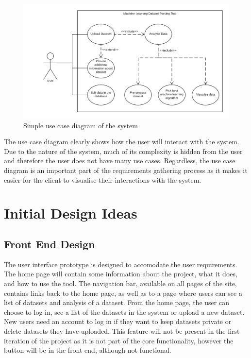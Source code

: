 \documentclass[titlepage]{article}
\begin{document}
\begin{figure}[h!]
  \centering
  \includegraphics[width=\textwidth]{usecase}
  \caption{Simple use case diagram of the system}
  \label{usecase}
\end{figure}

The use case diagram clearly shows how the user will interact with the system. Due to the nature of the system, much of its complexity is hidden from the user and therefore the user does not have many use cases. Regardless, the use case diagram is an important part of the requirements gathering process as it makes it easier for the client to visualise their interactions with the system.

\section{Initial Design Ideas}
\subsection{Front End Design}
The user interface prototype is designed to accomodate the user requirements. The home page will contain some information about the project, what it does, and how to use the tool. The navigation bar, available on all pages of the site, contains links back to the home page, as well as to a page where users can see a list of datasets and analysis of a dataset. From the home page, the user can choose to log in, see a list of the datasets in the system or upload a new dataset. New users need an account to log in if they want to keep datasets private or delete datasets they have uploaded. This feature will not be present in the first iteration of the project as it is not part of the core functionality, however the button will be in the front end, although not functional.
\end{document}

